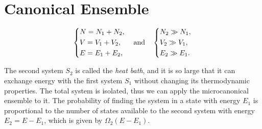 \section{Canonical Ensemble}
\begin{figure}[H]
    \begin{minipage}{0.5\textwidth}
        \centering
    \end{minipage}
    \hfill
    \begin{minipage}{0.45\textwidth}
        \[
            \begin{dcases}
                N = N_1 + N_2, \\
                V = V_1 + V_2, \\
                E = E_1 + E_2,
            \end{dcases} \quad \text{and} \quad
            \begin{dcases}
                N_2 \gg N_1, \\
                V_2 \gg V_1, \\
                E_2 \gg E_1.
            \end{dcases}
        \]
    \end{minipage}
\end{figure}

The second system \(S_2\) is called the \textit{heat bath}, and it is so large that it can exchange energy with the first system \(S_1\) without changing its thermodynamic properties. The total system is isolated, thus we can apply the microcanonical ensemble to it. The probability of finding the system in a state with energy \(E_1\) is proportional to the number of states available to the second system with energy \(E_2 = E - E_1\), which is given by \(\Omega_2(E - E_1)\).

